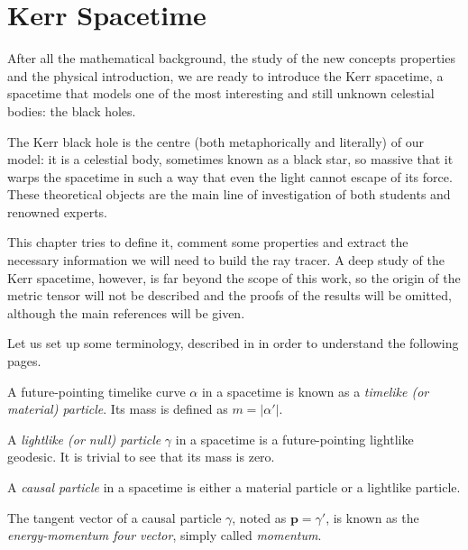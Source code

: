 \chapter{Kerr Spacetime}
\label{chapter:kerr}

After all the mathematical background, the study of the new concepts properties and the physical introduction, we are ready to introduce the Kerr spacetime, a spacetime that models one of the most interesting and still unknown celestial bodies: the black holes.

The Kerr black hole is the centre (both metaphorically and literally) of our model: it is a celestial body, sometimes known as a black star, so massive that it warps the spacetime in such a way that even the light cannot escape of its force. These theoretical objects are the main line of investigation of both students and renowned experts.

This chapter tries to define it, comment some properties and extract the necessary information we will need to build the ray tracer. A deep study of the Kerr spacetime, however, is far beyond the scope of this work, so the origin of the metric tensor will not be described and the proofs of the results will be omitted, although the main references will be given.

Let us set up some terminology, described in \cite[Def. 1.6.2, 1.6.3]{oneill95} in order to understand the following pages.

\begin{definition}
	A future-pointing timelike curve $\alpha$ in a spacetime is known as a \emph{timelike (or material) particle}. Its mass is defined as $m = \vert \alpha' \vert$.
\end{definition}

\begin{definition}
	A \emph{lightlike (or null) particle} $\gamma$ in a spacetime is a future-pointing lightlike geodesic. It is trivial to see that its mass is zero.
\end{definition}

\begin{definition}
	A \emph{causal particle} in a spacetime is either a material particle or a lightlike particle.
\end{definition}

The tangent vector of a causal particle $\gamma$, noted as $\mathbf{p} = \gamma'$, is known as the \emph{energy-momentum four vector}, simply called \emph{momentum}.

